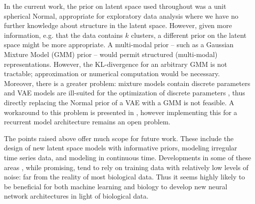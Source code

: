In the current work, the prior on latent space used throughout was a unit spherical Normal, appropriate for exploratory data analysis where we have no further knowledge about structure in the latent space.
However, given more information, e.g. that the data contains $k$ clusters, a different prior on the latent space might be more appropriate. A multi-modal prior -- such as a Gaussian Mixture Model (GMM) prior -- would permit structured (multi-modal) representations. However, the KL-divergence for an arbitrary GMM is not tractable; approximation  \citep{hershey2007approximating} or numerical computation would be necessary. Moreover, there is a greater problem: mixture models contain discrete parameters and VAE models are ill-suited for the optimization of discrete parameters \citep{dilokthanakul2016deep}, thus directly replacing the Normal prior of a VAE with a GMM is not feasible. A workaround to this problem is presented in \citep{dilokthanakul2016deep}, however implementing this for a recurrent model architecture remains an open problem. 
\par 
The points raised above offer much scope for future work. These include the design of new latent space models with informative priors, modeling irregular time series data, and modeling in continuous time. Developments in some of these areas \citep{chen2018neural}, while promising, tend to rely on training data with relatively low levels of noise: far from the reality of most biological data. Thus it seems highly likely to be beneficial for both machine learning and biology to develop new neural network architectures in light of biological data. 








